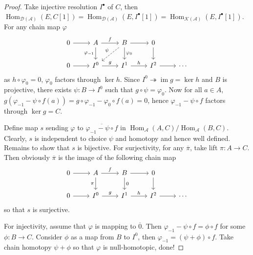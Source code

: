 \documentclass{ctexart}
\renewcommand{\hom}{\operatorname{Hom}}
\newcommand{\im}{\operatorname{im}}
\begin{document}
\begin{proof}
    Take injective resolution $I^{\bullet}$ of $C$, then $\hom_{\mathcal{D}(\mathscr{A})}(E, C[1]) = \hom_{\mathcal{D}(\mathscr{A})}(E, I^{\bullet}[1]) = \hom_{\mathcal{K}(\mathscr{A})}(E, I^{\bullet}[1])$.
    For any chain map $\varphi$
    \begin{equation}
        \begin{tikzcd}
            0 \arrow[r] &
            A \arrow[r, "f"] \arrow[d, "\varphi_{-1}" swap] &
            B \arrow[r] \arrow[d, "\varphi_{0}"] \arrow[dl, dashrightarrow, "\psi" swap] &
            0 \arrow[d] & \\
            0 \arrow[r] &
            I^{0} \arrow[r, "g"] &
            I^{1} \arrow[r, "h"] &
            I^{2} \arrow[r] &
            \cdots 
        \end{tikzcd}
    \end{equation}
    as $h \circ \varphi_{0} = 0$, $\varphi_{0}$ factors through $\ker h$.
    Since $I^{0} \twoheadrightarrow \im g = \ker h$ and $B$ is projective, 
    there exists $\psi: B \rightarrow I^{0}$ such that $g \circ \psi = \varphi_{0}$.
    Now for all $a\in A$, $g(\varphi_{-1} - \psi \circ f(a)) = g \circ \varphi_{-1} - \varphi_{0} \circ f(a) = 0$,
    hence $\varphi_{-1} - \psi \circ f$ factors through $\ker g = C$.
    \par
    Define map $s$ sending $\varphi$ to $\overline{\varphi_{-1} - \psi \circ f}$ in $\hom_{\mathscr{A}}(A, C)/\hom_{\mathscr{A}}(B, C)$.
    Clearly, $s$ is independent to choice $\psi$ and homotopy and hence well defined.
    Remains to show that $s$ is bijective.
    For surjectivity, for any $\overline{\pi}$, take lift $\pi: A \rightarrow C$.
    Then obviously $\overline{\pi}$ is the image of the following chain map
    \begin{equation}
        \begin{tikzcd}
            0 \arrow[r] &
            A \arrow[r, "f"] \arrow[d, "\pi" swap] &
            B \arrow[r] \arrow[d, "0"]&
            0 \arrow[d] & \\
            0 \arrow[r] &
            I^{0} \arrow[r, "g"] &
            I^{1} \arrow[r, "h"] &
            I^{2} \arrow[r] &
            \cdots 
        \end{tikzcd}
    \end{equation}
    so that $s$ is surjective.
    \par
    For injectivity, assume that $\varphi$ is mapping to $\overline{0}$.
    Then $\varphi_{-1} - \psi \circ f = \phi \circ f$ for some $\phi: B \rightarrow C$.
    Consider $\phi$ as a map from $B$ to $I^{0}$, then $\varphi_{-1} = (\psi + \phi) \circ f$.
    Take chain homotopy $\psi + \phi$ so that $\varphi$ is null-homotopic, done!
\end{proof}
\end{document}
